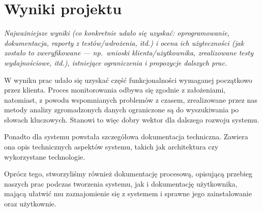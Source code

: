 \documentclass[polish,12pt]{aghthesis}
\begin{document}
\section{Wyniki projektu}

\label{sec:wyniki-projektu}

\emph{Najważniejsze wyniki (co konkretnie udało się uzyskać:
  oprogramowanie, dokumentacja, raporty z testów/wdrożenia, itd.)
  i ocena ich użyteczności (jak zostało to zweryfikowane --- np.\ wnioski
  klienta/użytkownika, zrealizowane testy wydajnościowe, itd.),
  istniejące ograniczenia i propozycje dalszych prac.}

W wyniku prac udało się uzyskać część funkcjonalności
wymaganej początkowo przez klienta. Proces monitorowania odbywa się zgodnie z założeniami,
natomiast, z powodu wspomnianych problemów z czasem, zrealizowane przez nas metody analizy
zgromadzonych danych ograniczone są do wyszukiwania po słowach kluczowych. Stanowi
to więc dobry wektor dla dalszego rozwoju systemu.

Ponadto dla systemu powstała szczegółowa dokumentacja techniczna. Zawiera ona opis
technicznych aspektów systemu, takich jak architektura czy wykorzystane technologie.

Oprócz tego, stworzyliśmy również dokumentację procesową, opisującą przebieg naszych
prac podczas tworzenia systemu, jak i dokumentację użytkownika, mającą ułatwić mu 
zaznajomienie się z systemem i sprawne jego zainstalowanie oraz użytkownie. 


\nocite{artykul2011,ksiazka2011,narzedzie2011,projekt2011}


\end{document}
